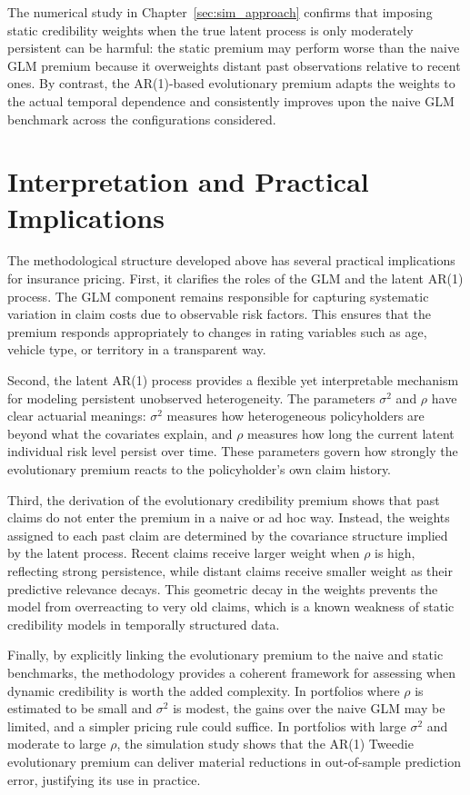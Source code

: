 \documentclass{sfuthesis}
\numberwithin{equation}{chapter}
\begin{document}
The numerical study in Chapter~\ref{sec:sim_approach} confirms that imposing
static credibility weights when the true latent process is only moderately
persistent can be harmful: the static premium may perform worse than the naive
GLM premium because it overweights distant past observations relative to recent
ones. By contrast, the AR(1)-based evolutionary premium adapts the weights to
the actual temporal dependence and consistently improves upon the naive
GLM benchmark across the configurations considered.

\section{Interpretation and Practical Implications}
\label{subsec:interpretation}

The methodological structure developed above has several practical
implications for insurance pricing. First, it clarifies the roles of the GLM
and the latent AR(1) process. The GLM component remains responsible for
capturing systematic variation in claim costs due to observable risk factors.
This ensures that the premium responds appropriately to changes in rating
variables such as age, vehicle type, or territory in a transparent way.

Second, the latent AR(1) process provides a flexible yet interpretable
mechanism for modeling persistent unobserved heterogeneity. The parameters
\(\sigma^2\) and \(\rho\) have clear actuarial meanings: \(\sigma^2\) measures
how heterogeneous policyholders are beyond what the covariates explain, and
\(\rho\) measures how long the current latent individual risk level persist over time. These parameters govern how strongly the evolutionary
premium reacts to the policyholder's own claim history.

Third, the derivation of the evolutionary credibility premium shows that past
claims do not enter the premium in a naive or ad hoc way. Instead, the weights
assigned to each past claim are determined by the covariance structure implied
by the latent process. Recent claims receive larger weight when \(\rho\) is
high, reflecting strong persistence, while distant claims receive smaller
weight as their predictive relevance decays. This geometric decay in the
weights prevents the model from overreacting to very old claims, which is a
known weakness of static credibility models in temporally structured data.

Finally, by explicitly linking the evolutionary premium to the naive and
static benchmarks, the methodology provides a coherent framework for assessing
when dynamic credibility is worth the added complexity. In portfolios where
\(\rho\) is estimated to be small and \(\sigma^2\) is modest, the gains over
the naive GLM may be limited, and a simpler pricing rule could suffice. In
portfolios with large \(\sigma^2\) and moderate to large \(\rho\), the
simulation study shows that the AR(1) Tweedie evolutionary premium can deliver
material reductions in out-of-sample prediction error, justifying its use in
practice.
\end{document}
